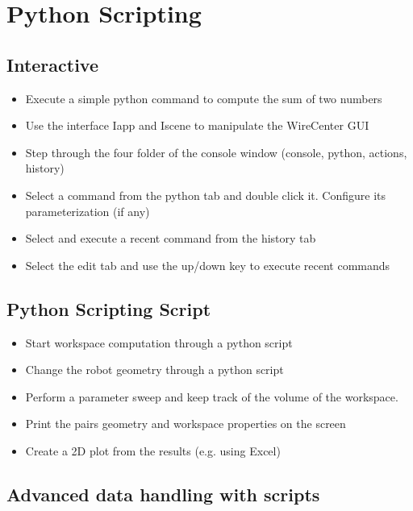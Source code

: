 \section{Python Scripting}
\subsection{Interactive}

\begin{itemize}
\item  {Execute a simple python command to compute the sum of
  two
  numbers}
\item  {Use the interface Iapp and Iscene to manipulate the
  WireCenter
  GUI}
\item  {Step through the four folder of the console window
  (console, python, actions,
  history)}
\item  {Select a command from the python tab and double click
  it. Configure its parameterization (if
  any)}
\item  {Select and execute a recent command from the history
  tab}
\item  {Select the edit tab and use the up/down key to execute
  recent
  commands}
\end{itemize}



\subsection{Python Scripting Script}

\begin{itemize}
\item  {Start workspace computation through a python
  script}
\item  {Change the robot geometry through a python
  script}
\item  {Perform a parameter sweep and keep track of the volume
  of the workspace.
  }
\item  {Print the pairs geometry and workspace properties on
  the
  screen}
\item  {Create a 2D plot from the results (e.g. using
  Excel)}
\end{itemize}

\subsection{Advanced data handling with scripts}

